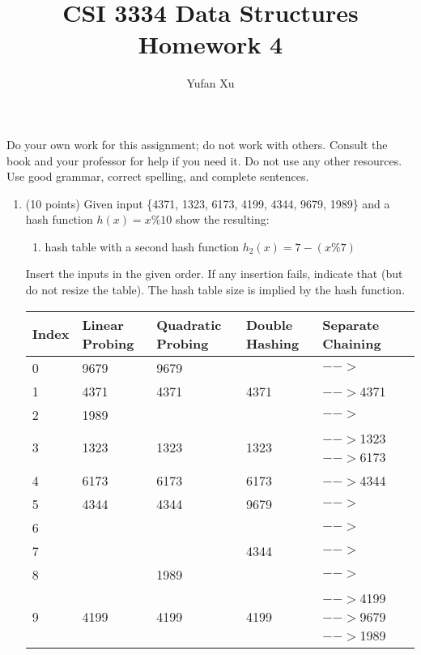\documentclass[12pt]{article}
\title{CSI 3334 Data Structures\\Homework 4}
\author{Yufan Xu}
\begin{document}
\thispagestyle{empty}

\maketitle 



Do your own work for this assignment; do not work with others. Consult the book
and your professor for help if you need it. Do not use any other resources.  
Use good grammar, correct spelling, and complete sentences.


\begin{enumerate}


\item \label{itm:hashing} (10 points) Given input \{4371, 1323, 6173, 4199, 4344, 9679, 1989\} and a hash function $h(x) = x\%10$ show the resulting:
	\begin{enumerate}
		\item hash table with a second hash function $h_2(x) = 7-(x\%7)$
	\end{enumerate}

Insert the inputs in the given order. If any insertion fails, indicate that (but do not resize the table). The hash table size is implied by the hash function. 


\small{

	\begin{tabular}{| p{10mm}  | p{20mm} |p{20mm} |p{20mm} |p{60mm}|}
	\hline
		Index & Linear Probing &Quadratic Probing & Double Hashing & Separate Chaining\\ \hline
		0 & 9679 & 9679 & & $-->$\\ \hline
		1 & 4371 & 4371 & 4371 &$-->$4371\\ \hline		
		2 & 1989 & & &$-->$ \\ \hline
		3 & 1323 & 1323 & 1323 &$-->$1323$-->$6173\\ \hline
		4 & 6173 & 6173 & 6173 &$-->$4344\\ \hline
		5 & 4344 & 4344 & 9679 &$-->$ \\ \hline 
		6 & & & & $-->$\\ \hline
		7 & & & 4344& $-->$ \\ \hline
		8 & & 1989 & & $-->$ \\ \hline
		9 & 4199 & 4199 & 4199 &$-->$4199$-->$9679$-->$1989\\ \hline
	\end{tabular}
}


\end{enumerate}
\end{document}
